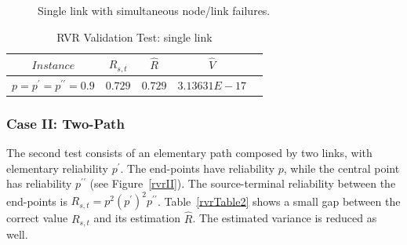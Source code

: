 \begin{figure}[H]
\begin{center}
\caption{Single link with simultaneous node/link failures. \label{rvrI}}
\end{center}
\end{figure}

\begin{table}[H]
\caption{RVR Validation Test: single link} %
\centering  %
\begin{tabular}{|c|c|c|c|c|} %
\hline	$Instance$   &	$R_{s,t}$ & $\hat{R}$&  $\hat{V}$ \\
\hline	$p=p^{\prime}=p^{\prime \prime}=0.9$	& $0.729$ &	$0.729$ 	&	$3.13631E-17$	\\
\hline
\end{tabular}
\label{rvrTable1} %
\end{table}


\subsubsection*{Case II: Two-Path}
The second test consists of an elementary path composed by two links, with elementary reliability $p^{\prime}$. 
The end-points have reliability $p$, while the central point has reliability $p^{\prime \prime}$ 
(see Figure~\ref{rvrII}). The source-terminal reliability between the end-points is 
$R_{s,t}=p^2(p^{\prime})^2 p^{\prime \prime}$. Table~\ref{rvrTable2} shows a small gap between 
the correct value $R_{s,t}$ and its estimation $\hat{R}$. The estimated variance is reduced as well.

